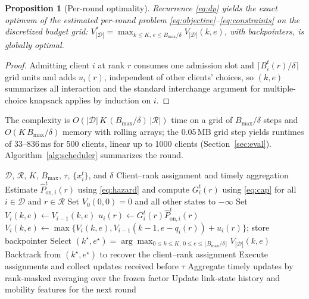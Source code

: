 \documentclass[conference]{IEEEtran}
\newtheorem{proposition}{Proposition}
\begin{document}
\begin{proposition}[Per-round optimality]
\label{prop:opt}
Recurrence \eqref{eq:dp} yields the exact optimum of the estimated per-round problem \eqref{eq:objective}--\eqref{eq:constraints} on the discretized budget grid: $V^*_{|\mathcal D|}=\max_{k\le K,\,e\le B_{\max}/\delta}V_{|\mathcal D|}(k,e)$, with backpointers, is globally optimal.
\end{proposition}
\begin{proof}
Admitting client $i$ at rank $r$ consumes one admission slot and $\lceil B_i^t(r)/\delta\rceil$ grid units and adds $u_i(r)$, independent of other clients' choices, so $(k,e)$ summarizes all interaction and the standard interchange argument for multiple-choice knapsack applies by induction on $i$.
\end{proof}

The complexity is $O(|\mathcal D|\,K\,(B_{\max}/\delta)\,|\mathcal R|)$ time on a grid of $B_{\max}/\delta$ steps and $O(K\,B_{\max}/\delta)$ memory with rolling arrays; the 0.05\,MB grid step yields runtimes of 33--836\,ms for 500 clients, linear up to 1000 clients (Section~\ref{sec:eval}). Algorithm~\ref{alg:scheduler} summarizes the round.

\begin{algorithm}[t]
\caption{Deadline-aware adaptive-rank scheduling for one round}
\label{alg:scheduler}
\footnotesize
\begin{algorithmic}[1]
\REQUIRE $\mathcal D$, $\mathcal R$, $K$, $B_{\max}$, $\tau$, $\{x_i^t\}$, and $\delta$
\ENSURE Client--rank assignment and timely aggregation
\STATE Estimate $\hat P_{\mathrm{on},i}^t(r)$ using \eqref{eq:hazard} and compute $G_i^t(r)$ using \eqref{eq:cap} for all $i\in\mathcal D$ and $r\in\mathcal R$
\STATE Set $V_0(0,0)=0$ and all other states to $-\infty$
    \STATE Set $V_i(k,e)\leftarrow V_{i-1}(k,e)$
        \STATE $u_i(r)\leftarrow G_i^t(r)\hat P_{\mathrm{on},i}^t(r)$
        \STATE $V_i(k,e)\leftarrow\max\{V_i(k,e),V_{i-1}(k-1,e-q_i(r))+u_i(r)\}$; store backpointer
    \ENDFOR
\ENDFOR
\STATE Select $(k^\star,e^\star)=\arg\max_{0\leq k\leq K,\,0\leq e\leq\lfloor B_{\max}/\delta\rfloor}V_{|\mathcal D|}(k,e)$
\STATE Backtrack from $(k^\star,e^\star)$ to recover the client--rank assignment
\STATE Execute assignments and collect updates received before $\tau$
\STATE Aggregate timely updates by rank-masked averaging over the frozen factor
\STATE Update link-state history and mobility features for the next round
\end{algorithmic}
\end{algorithm}
\end{document}
